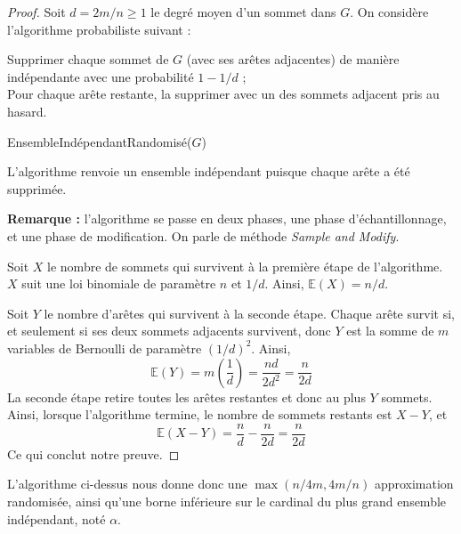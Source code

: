 \begin{proof}
Soit $d=2m/n \geq 1$ le degré moyen d'un sommet dans $G$. On considère l'algorithme probabiliste suivant :

\begin{algorithm}
Supprimer chaque sommet de $G$ (avec ses arêtes adjacentes) de manière indépendante avec une probabilité $1-1/d$ ;\\
Pour chaque arête restante, la supprimer avec un des sommets adjacent pris au hasard.
\caption{EnsembleIndépendantRandomisé($G$)}
\end{algorithm}

L'algorithme renvoie un ensemble indépendant puisque chaque arête a été supprimée.\newline

\noindent \textbf{Remarque :} l'algorithme se passe en deux phases, une phase d’échantillonnage, et une phase de modification. On parle de méthode \textit{Sample and Modify}.\newline

Soit $X$ le nombre de sommets qui survivent à la première étape de l'algorithme. $X$ suit une loi binomiale de paramètre $n$ et $1/d$. Ainsi, $\mathbb{E}(X)=n/d$.

Soit $Y$ le nombre d'arêtes qui survivent à la seconde étape. Chaque arête survit si, et seulement si ses deux sommets adjacents survivent, donc $Y$ est la somme de $m$ variables de Bernoulli de paramètre $(1/d)^2$. Ainsi,
$$
\mathbb{E}(Y) = m \left( \frac{1}{d}\right) = \frac{nd}{2d^2} = \frac{n}{2d}
$$
La seconde étape retire toutes les arêtes restantes et donc au plus $Y$ sommets. Ainsi, lorsque l'algorithme termine, le nombre de sommets restants est $X-Y$, et 
$$
\mathbb{E}(X-Y) = \frac{n}{d} - \frac{n}{2d} = \frac{n}{2d}
$$
Ce qui conclut notre preuve.
\end{proof}

L'algorithme ci-dessus nous donne donc une $\max(n/4m, 4m/n)$ approximation randomisée, ainsi qu'une borne inférieure sur le cardinal du plus grand ensemble indépendant, noté $\alpha$.
